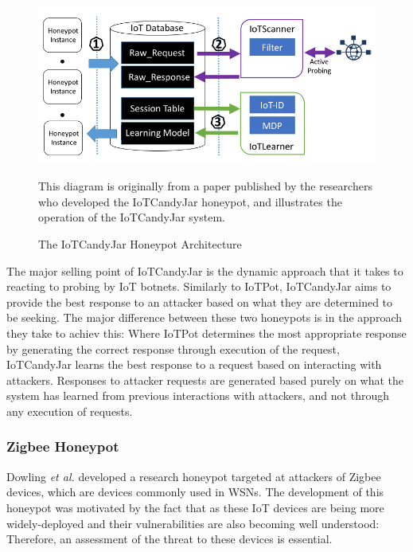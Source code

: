 \begin{figure}[ht]
      \centering
      \includegraphics[width=150mm, scale=1]{Images/iot-candy-jar-sys-arch1.PNG}
      \caption{The IoTCandyJar Honeypot Architecture} 
      \medskip
	  \small
		This diagram is originally from a paper published by the researchers who developed the IoTCandyJar honeypot, and illustrates the operation of the IoTCandyJar system. \cite{IoTCandyJar} 
\label{fig:Images/iot-candy-jar-sys-arch1.PNG}
\end{figure}

The major selling point of IoTCandyJar is the dynamic approach that it takes to reacting to probing by IoT botnets. Similarly to IoTPot, IoTCandyJar aims to provide the best response to an attacker based on what they are determined to be seeking. The major difference between these two honeypots is in the approach they take to achiev this: Where IoTPot determines the most appropriate response by generating the correct response through execution of the request, IoTCandyJar learns the best response to a request based on interacting with attackers. Responses to attacker requests are generated based purely on what the system has learned from previous interactions with attackers, and not through any execution of requests. \cite{IoTCandyJar}

    
  	\subsubsection{Zigbee Honeypot} \label{AboutZigbeeHoneypot}
    Dowling \textit{et al.} developed a research honeypot targeted at attackers of Zigbee devices, which are devices commonly used in WSNs. \cite{Dowling2017} The development of this honeypot was motivated by the fact that as these IoT devices are being more widely-deployed and their vulnerabilities are also becoming well understood: Therefore, an assessment of the threat to these devices is essential.
      
